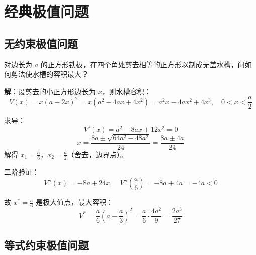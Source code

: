 \section{经典极值问题}\label{sec:classical}

\subsection{无约束极值问题}

\begin{example}[正方形剪角问题]\label{ex:box}
对边长为 $a$ 的正方形铁板，在四个角处剪去相等的正方形以制成无盖水槽，问如何剪法使水槽的容积最大？

\textbf{解}：设剪去的小正方形边长为 $x$，则水槽容积：
\[
V(x) = x(a - 2x)^2 = x(a^2 - 4ax + 4x^2) = a^2 x - 4ax^2 + 4x^3,\quad 0 < x < \frac{a}{2}
\]

求导：
\[
V'(x) = a^2 - 8ax + 12x^2 = 0
\]
\[
x = \frac{8a \pm \sqrt{64a^2 - 48a^2}}{24} = \frac{8a \pm 4a}{24}
\]
解得 $x_1 = \frac{a}{6}$，$x_2 = \frac{a}{2}$（舍去，边界点）。

二阶验证：
\[
V''(x) = -8a + 24x,\quad V''\left(\frac{a}{6}\right) = -8a + 4a = -4a < 0
\]

故 $x^* = \frac{a}{6}$ 是极大值点，最大容积：
\[
V^* = \frac{a}{6}\left(a - \frac{a}{3}\right)^2 = \frac{a}{6} \cdot \frac{4a^2}{9} = \frac{2a^3}{27}
\]
\end{example}

\subsection{等式约束极值问题}

